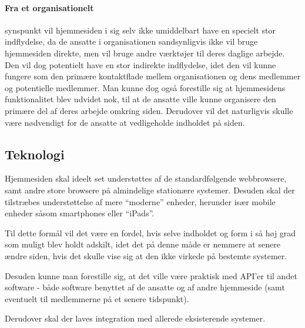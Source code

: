 \paragraph{Fra et organisationelt} synspunkt vil hjemmesiden i sig selv ikke
umiddelbart have en specielt stor indflydelse, da de ansatte i organisationen
sandsynligvis ikke vil bruge hjemmesiden direkte, men vil bruge andre
værktøjer til deres daglige arbejde. Den vil dog potentielt have en stor
indirekte indflydelse, idet den vil kunne fungere som den primære kontaktflade
mellem organisationen og dens medlemmer og potentielle medlemmer. Man kunne
dog også forestille sig at hjemmesidens funktionalitet blev udvidet nok, til
at de ansatte ville kunne organisere den primære del af deres arbejde omkring
siden. Derudover vil det naturligvis skulle være nødvendigt for de ansatte at
vedligeholde indholdet på siden.

\subsection{Teknologi}
Hjemmesiden skal ideelt set understøttes af de standardfølgende webbrowsere, samt andre
store browsere på almindelige stationære systemer. Desuden skal der tilstræbes
understøttelse af mere ``moderne'' enheder, herunder især mobile enheder såsom
smartphones eller ``iPads''.

Til dette formål vil det være en fordel, hvis selve indholdet og form i så høj
grad som muligt blev holdt adskilt, idet det på denne måde er nemmere at senere
ændre siden, hvis det skulle vise sig at den ikke virkede på bestemte systemer.

Desuden kunne man forestille sig, at det ville være praktisk med API'er til
andet software - både software benyttet af de ansatte og af andre hjemmeside
(samt eventuelt til medlemmerne på et senere tidspunkt).

Derudover skal der laves integration med allerede eksisterende systemer.
